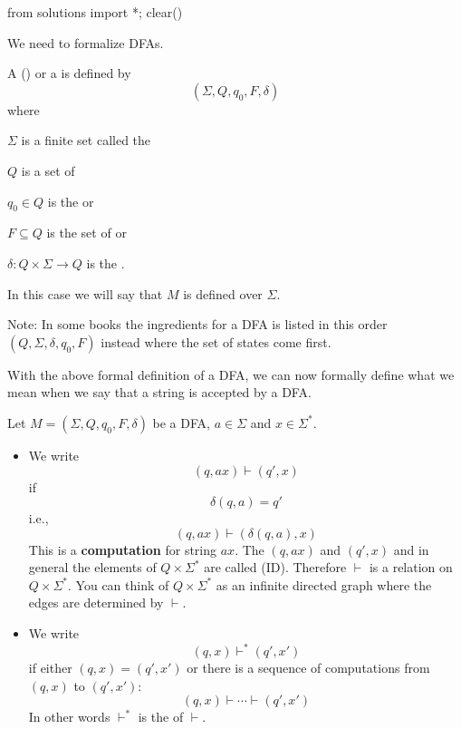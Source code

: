 \begin{python0}
from solutions import *; clear()
\end{python0}

We need to formalize DFAs.

\begin{defn}
  A 
  (\sidebarskip{16pt})
  or a
  \sidebarskip{8pt}\sidebarskip{4pt}
  is defined by
  \[
  (\Sigma,Q,q_0,F,\delta)
  \]
  where
  \begin{tightlist}
  \item $\Sigma$ is a finite set called the
  \item $Q$ is a set of 
  \item $q_0 \in Q$ is the
    or
    \sidebarskip{12pt}
  \item $F \subseteq Q$ is the set of 
    or
    \sidebarskip{18pt}
  \item $\delta : Q \times \Sigma \rightarrow Q$ is the
    .
  \end{tightlist}
  In this case we will say that $M$ is defined over $\Sigma$.
\end{defn}

Note: In some books the ingredients
for a DFA is listed in this order $(Q, \Sigma, \delta, q_0, F)$
instead where the set of states come first.




\newpage
With the above formal definition of a DFA, we can now formally
define what we mean when we say that a string is accepted by a
DFA.

\begin{defn}
Let $M=(\Sigma,Q,q_0,F,\delta)$ be a DFA, $a\in\Sigma$ and $x \in
\Sigma^*$.
\begin{itemize}
  \item We write
   \[ (q,ax) \vdash (q',x) \]
   if
   \[ \delta(q,a) = q' \]
   i.e.,
   \[
   (q,ax) \vdash (\delta(q,a),x)
   \]
   This is a \textbf{computation} for string $ax$.
   The $(q, ax)$ and $(q', x)$ and in general
   the elements of $Q \times \Sigma^*$ are called
    (ID).
   Therefore $\vdash$ is a relation on $Q \times \Sigma^*$.
   You can think of $Q \times \Sigma^*$ as an infinite
   directed graph where the edges are determined by $\vdash$.

  \item We write
  \[ (q,x) \vdash^* (q',x') \]
  if either $(q,x) = (q',x')$ or there is a sequence of
  computations from $(q,x)$ to $(q',x')$:
  \[ (q,x) \vdash \cdots \vdash (q',x') \]
  In other words $\vdash^*$ is the  of $\vdash$.
\end{itemize}
\end{defn}


